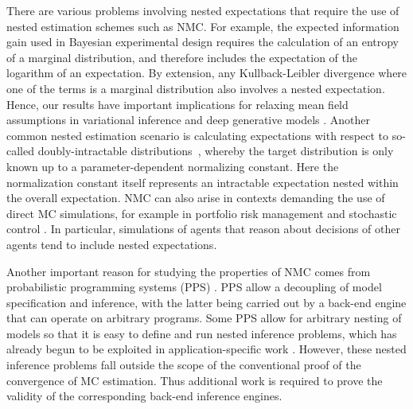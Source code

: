 There are various problems involving nested expectations that require the use of nested
estimation schemes such as NMC. For example, the expected information gain used in
Bayesian experimental design \citep{chaloner1995bayesian,sebastiani2000maximum} requires
the calculation of an entropy of a marginal distribution, and therefore includes the
expectation of the logarithm of an expectation.  By extension, any Kullback-Leibler
divergence where one of the terms is a marginal distribution also involves a nested expectation.  Hence, our results have important implications for relaxing mean field assumptions in variational
inference \citep{hoffman2015stochastic,naesseth2017variational,maddison2017filtering} and deep generative models
\citep{burda2015importance,maaloe2016auxiliary,le2017auto}.
Another common nested estimation scenario is calculating expectations with respect to so-called
doubly-intractable distributions~\citep{moller2006efficient,murray2006mcmc,liang2010double}, whereby
the target distribution is only known up to a parameter-dependent normalizing constant.  Here
the normalization constant itself represents an intractable expectation
nested within the overall expectation.
NMC can also arise in contexts demanding the use
of direct MC simulations, for example in portfolio risk management
\citep{gordy2010nested} and stochastic control \citep{belomestny2010regression}. 
In particular, 
simulations of agents that reason about decisions of other agents tend to include nested expectations.

Another important reason for studying the properties of NMC comes from
probabilistic programming systems (PPS)
\citep{goodman2008church,wood2014new}.
PPS allow a decoupling of model specification and inference, with the latter being carried out
by a back-end engine that can operate on arbitrary programs. Some PPS allow for
arbitrary nesting of models so that it is easy to define and run nested inference
problems, which has already begun to be exploited in application-specific work
\citep{ouyang2016practical}. However, these nested inference problems fall outside the
scope of the conventional proof of the convergence of MC estimation. Thus additional
work is required to prove the validity of the corresponding back-end inference engines.

